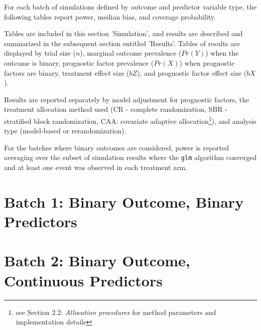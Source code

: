For each batch of simulations defined by outcome and predictor variable type, the following tables report power, median bias, and coverage probability.

Tables are included in this section 'Simulation', and results are described and summarized in the subsequent section entitled 'Results'.
Tables of results are displayed by trial size ($n$), marginal outcome prevalence ($Pr( Y )$) when the outcome is binary, prognostic factor prevalence ($Pr( X )$) when prognostic factors are binary, treatment effect size ($bZ$), and prognostic factor effect size ($bX$).

Results are reported separately by model adjustment for prognostic factors, 
the treatment allocation method used (CR - complete randomization, SBR - stratified block randomization, CAA: covariate adaptive allocation\footnote{see Section 2.2: \textit{Allocation procedures} for method parameters and implementation details}), 
and analysis type (model-based or rerandomization).

For the batches where binary outcomes are considered, power is reported averaging over the subset of simulation results where the \texttt{glm} algorithm converged and at least one event was observed in each treatment arm.

\newpage

\section[Binary Y, binary X]{Batch 1: Binary Outcome, Binary Predictors}


 \newpage 
 \newpage
 \newpage

 \newpage 


\section[Binary Y, continuous X]{Batch 2: Binary Outcome, Continuous Predictors}


